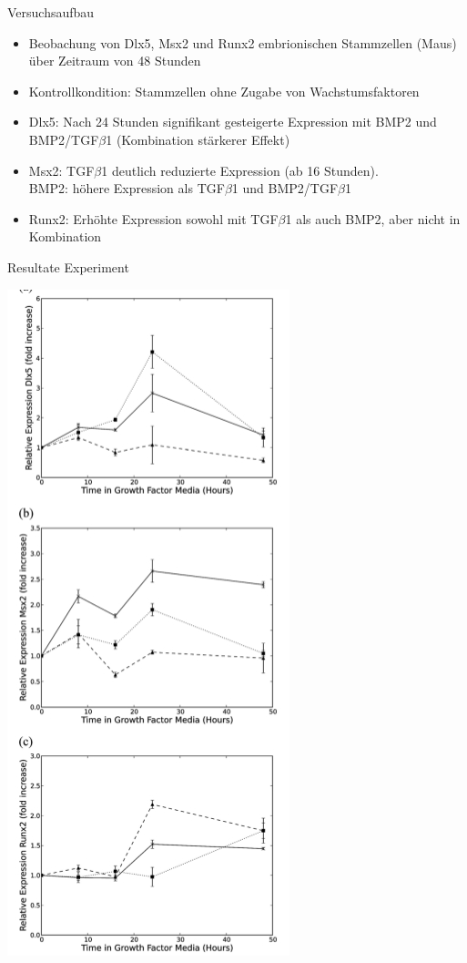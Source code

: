 \documentclass[handout]{beamer}
\begin{document}
\begin{frame}{Versuchsaufbau}
\begin{itemize}
	\item Beobachung von Dlx5, Msx2 und Runx2 embrionischen Stammzellen (Maus) \"uber Zeitraum von 48 Stunden
	\pause
	\item Kontrollkondition: Stammzellen ohne Zugabe von Wachstumsfaktoren
	\pause
	\item Dlx5: Nach 24 Stunden signifikant gesteigerte Expression mit BMP2 und BMP2/TGF$\beta$1 (Kombination st\"arkerer Effekt)
	\pause
	\item Msx2: TGF$\beta$1 deutlich reduzierte Expression (ab 16 Stunden). 
	\pause
	\\ BMP2: h\"ohere Expression als TGF$\beta$1 und BMP2/TGF$\beta$1
	\item Runx2: Erh\"ohte Expression sowohl mit TGF$\beta$1 als auch BMP2, aber nicht in Kombination
\end{itemize}
\end{frame}

\begin{frame}{Resultate Experiment}
\begin{center}
\includegraphics[scale=0.25, center]{expression_experiment.jpg}
\end{center}
\end{frame}
\end{document}
